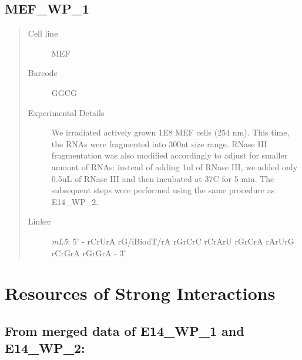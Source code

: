 \documentclass[letterpaper,10pt,english]{sphinxmanual}
\begin{document}
\subsection{MEF\_WP\_1}
\label{Data_Resources:mef-wp-1}\begin{quote}\begin{description}
\item[{Cell line}] \leavevmode
MEF

\item[{Barcode}] \leavevmode
GGCG

\item[{Experimental Details}] \leavevmode
We irradiated actively grown 1E8 MEF cells (254 nm). This time, the RNAs
were fragmented into 300nt size range. RNase III fragmentation was also modified accordingly
to adjust for smaller amount of RNAs: instead of adding 1ul of RNase III, we added only 0.5uL
of RNase III and then incubated at 37C for 5 min. The subsequent steps were performed using
the same procedure as E14\_WP\_2.

\item[{Linker}] \leavevmode
\emph{mL5}: 5' - rCrUrA rG/iBiodT/rA rGrCrC rCrArU rGrCrA rArUrG rCrGrA rGrGrA - 3'

\end{description}\end{quote}


\section{Resources of Strong Interactions}
\label{Data_Resources:resources-of-strong-interactions}

\subsection{From merged data of E14\_WP\_1 and E14\_WP\_2:}
\label{Data_Resources:from-merged-data-of-e14-wp-1-and-e14-wp-2}
\end{document}
